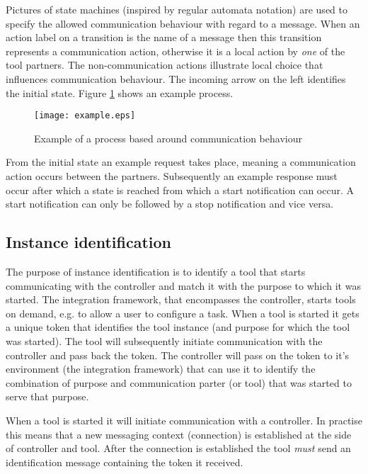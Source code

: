 \documentclass{article}
\begin{document}
   \noindent Pictures of state machines (inspired by regular automata notation)
   are used to specify the allowed communication behaviour with regard to a
   message. When an action label on a transition is the name of a message then
   this transition represents a communication action, otherwise it is a local
   action by \emph{one} of the tool partners. The non-communication actions
   illustrate local choice that influences communication behaviour. The
   incoming arrow on the left identifies the initial state. Figure
   \ref{fig:process_example} shows an example process.

   \begin{figure}[H]
    \begin{center}
     \texttt{[image: example.eps]}
    \end{center}
    \vspace{-0.3cm}
    \caption{Example of a process based around communication behaviour}
    \label{fig:process_example}
   \end{figure}

   From the initial state an example request takes place, meaning a
   communication action occurs between the partners. Subsequently an example
   response must occur after which a state is reached from which a start
   notification can occur. A start notification can only be followed by a stop
   notification and vice versa. 

  \subsection{Instance identification} \label{s:instance_identification}

   The purpose of instance identification is to identify a tool that starts
   communicating with the controller and match it with the purpose to which it
   was started.  The integration framework, that encompasses the controller,
   starts tools on demand, e.g. to allow a user to configure a task. When a
   tool is started it gets a unique token that identifies the tool instance
   (and purpose for which the tool was started).  The tool will subsequently
   initiate communication with the controller and pass back the token. The
   controller will pass on the token to it's environment (the integration
   framework) that can use it to identify the combination of purpose and
   communication parter (or tool) that was started to serve that purpose.
   
   When a tool is started it will initiate communication with a controller.  In
   practise this means that a new messaging context (connection) is established
   at the side of controller and tool.  After the connection is established the
   tool \emph{must} send an identification message containing the token it
   received.
   
\end{document}
